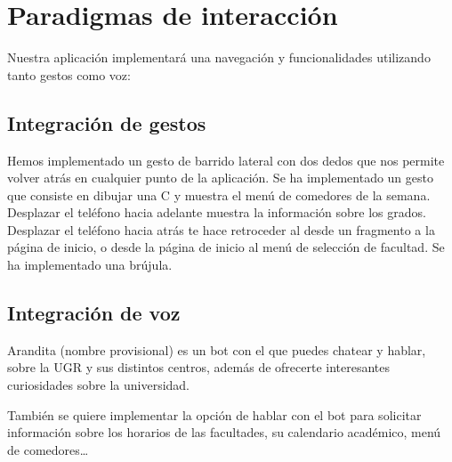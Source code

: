 \section{Paradigmas de interacción}

Nuestra aplicación implementará una navegación y funcionalidades utilizando tanto gestos como voz:

\subsection{Integración de gestos}
Hemos implementado un gesto de barrido lateral con dos dedos que nos permite volver atrás en cualquier punto de la aplicación.
Se ha implementado un gesto que consiste en dibujar una C y muestra el menú de comedores de la semana.
Desplazar el teléfono hacia adelante muestra la información sobre los grados.
Desplazar el teléfono hacia atrás te hace retroceder al desde un fragmento a la página de inicio, o desde la página de inicio al menú de selección de facultad.
Se ha implementado una brújula.

\subsection{Integración de voz}

Arandita (nombre provisional) es un bot con el que puedes chatear y hablar, sobre la UGR y sus distintos centros, además de ofrecerte interesantes curiosidades sobre la universidad.

También se quiere implementar la opción de hablar con el bot para solicitar  información sobre los horarios de las facultades, su calendario académico, menú de comedores…

